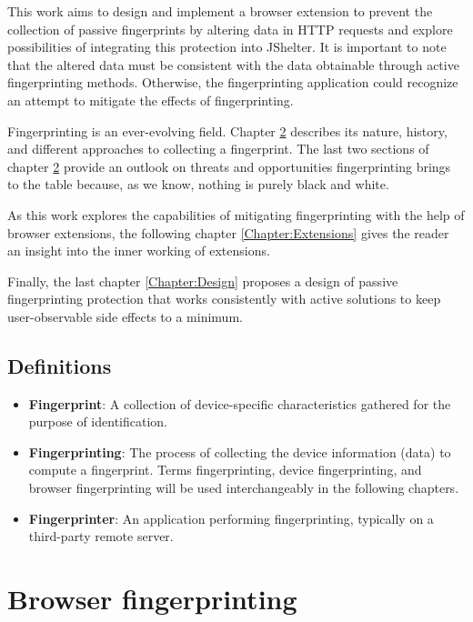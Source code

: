 This work aims to design and implement a browser extension to prevent the collection of passive fingerprints by altering data in HTTP requests and explore possibilities of integrating this protection into JShelter. It is important to note that the altered data must be consistent with the data obtainable through active fingerprinting methods. Otherwise, the fingerprinting application could recognize an attempt to mitigate the effects of fingerprinting.

Fingerprinting is an ever-evolving field. Chapter \ref{Chapter:BrowserFingerprinting} describes its nature, history, and different approaches to collecting a fingerprint. The last two sections of chapter \ref{Chapter:BrowserFingerprinting} provide an outlook on threats and opportunities fingerprinting brings to the table because, as we know, nothing is purely black and white.

As this work explores the capabilities of mitigating fingerprinting with the help of browser extensions, the following chapter \ref{Chapter:Extensions} gives the reader an insight into the inner working of extensions.

Finally, the last chapter \ref{Chapter:Design} proposes a design of passive fingerprinting protection that works consistently with active solutions to keep user-observable side effects to a minimum.

\section{Definitions}

\begin{itemize}
	\item \textbf{Fingerprint}: A collection of device-specific characteristics gathered for the purpose of identification.
	\item \textbf{Fingerprinting}: The process of collecting the device information (data) to compute a fingerprint. Terms fingerprinting, device fingerprinting, and browser fingerprinting will be used interchangeably in the following chapters.
	\item \textbf{Fingerprinter}: An application performing fingerprinting, typically on a third-party remote server.
\end{itemize}


\chapter{Browser fingerprinting}
\label{Chapter:BrowserFingerprinting}

